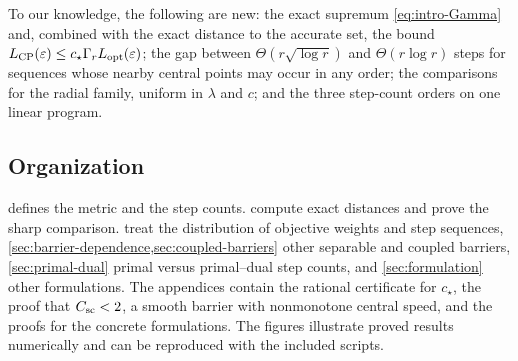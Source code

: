 To our knowledge, the following are new: the exact supremum
\eqref{eq:intro-Gamma} and, combined with the exact distance to the
accurate set, the bound $L_{\mathrm{CP}}(\varepsilon)\leq c_\star\Gamma_r L_{\mathrm{opt}}(\varepsilon)$;
the gap between $\Theta(r\sqrt{\log r})$ and $\Theta(r\log r)$ steps for
sequences whose nearby central points may occur in any order; the
comparisons for the radial family, uniform in $\lambda$ and $c$; and
the three step-count orders on one linear program.

\subsection{Organization}
 defines the metric and the step counts.
 compute exact distances
and prove the sharp comparison. 
treat the distribution of objective weights and step sequences,
\cref{sec:barrier-dependence,sec:coupled-barriers} other separable and
coupled barriers, \cref{sec:primal-dual} primal versus primal--dual
step counts, and \cref{sec:formulation} other formulations. The
appendices contain the rational certificate for $c_\star$, the proof
that $C_{\mathrm{sc}}<2$, a smooth barrier with nonmonotone central speed, and
the proofs for the concrete formulations. The figures illustrate
proved results numerically and can be reproduced with the included
scripts.
